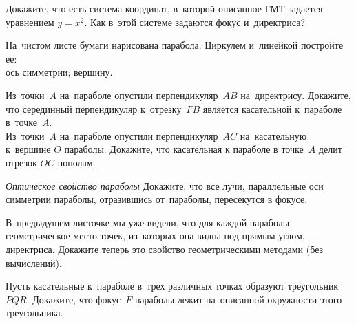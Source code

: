 \begin{problems}

\item
Докажите, что есть система координат, в~которой описанное ГМТ задается
уравнением $y = x^2$.
Как в~этой системе задаются фокус и~директриса?

\item
На~чистом листе бумаги нарисована парабола.
Циркулем и~линейкой постройте ее:
\\
\subproblem ось симметрии;
\qquad
\subproblem вершину.




\item
\subproblem
Из~точки~$A$ на~параболе опустили перпендикуляр~$AB$ на~директрису.
Докажите, что серединный перпендикуляр к~отрезку~$FB$ является касательной
к~параболе в~точке~$A$.
\\
\subproblem
Из~точки~$A$ на~параболе опустили перпендикуляр~$AC$ на~касательную
к~вершине $O$ параболы.
Докажите, что касательная к параболе в точке~$A$ делит отрезок $OC$ пополам.

\begin{figure}[h]
\begin{center}
\end{center}
\end{figure}

\item \emph{Оптическое свойство параболы}
Докажите, что все лучи, параллельные оси симметрии параболы, отразившись
от~параболы, пересекутся в фокусе.

\item
В~предыдущем листочке мы уже видели, что для каждой параболы геометрическое
место точек, из~которых она видна под прямым углом,~--- директриса.
Докажите теперь это свойство геометрическими методами (без вычислений).

\item
Пусть касательные к~параболе в~трех различных точках образуют
треугольник $PQR$.
Докажите, что фокус~$F$ параболы лежит на~описанной окружности этого треугольника.

\end{problems}

